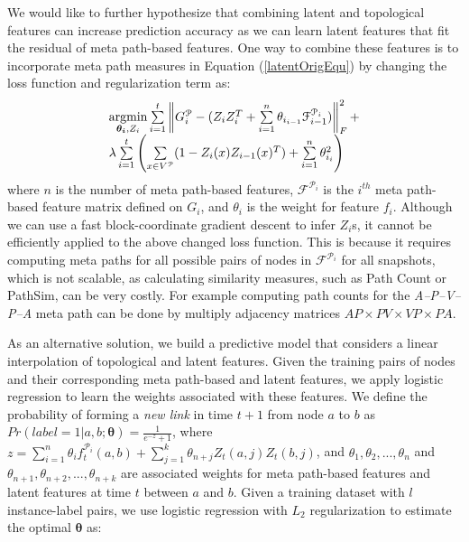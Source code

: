 We would like to further hypothesize that combining latent and topological features can increase prediction accuracy as we can learn latent features that fit the residual of meta path-based features. One way to combine these features is to incorporate meta path measures in Equation (\ref{latentOrigEqu}) by changing the loss function and regularization term as:
\begin{equation}\label{latentMetaEqu}
    \begin{array}{l}
\operatorname*{argmin}\limits_{\boldsymbol{\theta_i},Z_i}\sum\limits_{i=1}^{t}\left \| G^\mathcal{P}_i - (Z_{i}Z_{i}^T + \sum\limits_{i=1}^{n}\theta_{i_{i-1}} \mathcal{F}^{\mathcal{P}_i}_{i-1}) \right \|^2_F+
\\ 
\lambda \sum\limits_{i=1}^{t}\left(\sum\limits_{x \in V^\mathcal{P}}(1-Z_{i}(x)Z_{i-1}(x)^T) + \sum\limits_{i=1}^{n} \theta_{i_i}^2\right)\\
    \end{array}
\end{equation}
where $n$ is the number of meta path-based features, $\mathcal{F}^{\mathcal{P}_i}$ is the $i^{th}$ meta path-based feature matrix defined on $G_i$, and $\theta_i$ is the weight for feature $f_i$. Although we can use a fast block-coordinate gradient descent \cite{Zhu2016} to infer $Z_i$s, it cannot be efficiently applied to the above changed loss function. This is because it requires computing meta paths for all possible pairs of nodes in $\mathcal{F}^{\mathcal{P}_i}$ for all snapshots, which is not scalable, as calculating similarity measures, such as Path Count or PathSim, can be very costly. For example computing path counts for the \textit{A--P--V--P--A} meta path can be done by multiply adjacency matrices $AP\times PV\times VP\times PA$. 


As an alternative solution, we build a predictive model that considers a linear interpolation of topological and latent features. %
Given the training pairs of nodes and their corresponding meta path-based and latent features, we apply logistic regression to learn the weights associated with these features. We define the probability of forming a \textit{new link} in time $t+1$ from node $a$ to $b$ as %
 $Pr(label=1|a, b; \boldsymbol{\theta}) = \frac{1}{e^{-z}+1}$, where $z=\sum\limits_{i=1}^{n}\theta_i f_t^{\mathcal{P}_i}(a,b) + \sum\limits_{j=1}^{k} \theta_{n+j}Z_t(a,j)Z_t(b,j)$, and $\theta_1,\theta_2,..., \theta_n$ and $\theta_{n+1},\theta_{n+2},..., \theta_{n+k}$ are associated weights for meta path-based features and latent features at time $t$ between $a$ and $b$. Given a training dataset with $l$ instance-label pairs, we use logistic regression with $L_2$ regularization to estimate the optimal $\boldsymbol{\theta}$ as:%

